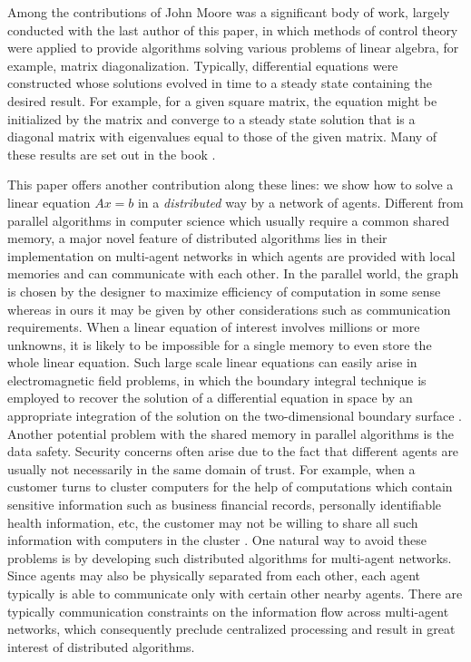 \documentclass{aims}
\begin{document}
Among the contributions of John Moore was a significant body of work,
largely conducted with the last author of this paper, in which methods of control theory
were applied to provide algorithms solving various problems of linear
algebra, for example, matrix diagonalization. Typically, differential
equations were constructed whose solutions evolved in time to a steady
state containing the desired result. For example, for a given square
matrix, the equation might be initialized by the matrix and converge
to a steady state solution that is a diagonal matrix with eigenvalues
equal to those of the given matrix.  Many of these results are set
out in the book \cite{UJ94Book}.

This paper offers another contribution along these lines: we show how
to solve a linear equation $Ax=b$ in a \emph{distributed} way by a network of agents. Different from parallel algorithms in computer science  \cite{O96Cam,RJ05Cam,CAnd97Report} which usually require a common shared memory, a major novel feature of distributed algorithms lies in their implementation on multi-agent networks in which agents are provided with local memories and can communicate with each other. In the parallel world, the graph is chosen by the designer to maximize efficiency of computation in some sense whereas  in ours it may be given by other considerations such as communication requirements. When a linear equation of interest involves millions or more unknowns, it is likely to be impossible for a single memory to even store the whole linear equation. Such large scale linear equations can easily arise in electromagnetic field problems, in which the boundary integral technique is employed to recover the solution of a differential equation in space by an appropriate integration of the solution on the two-dimensional boundary surface \cite{Edelman93}. Another potential problem with the shared memory in parallel algorithms is the data safety. Security concerns often arise due to the fact that different agents are usually not necessarily in the same domain of trust. For example, when a customer turns to cluster computers for the help of computations which contain sensitive information such as business financial records, personally identifiable health information, etc, the customer may not be willing to share all such information with computers in the cluster \cite{CKJQ13TPD}. One natural way to avoid these problems is by developing such distributed algorithms for multi-agent networks. Since agents may also be physically separated from each other, each agent typically is  able to communicate only with certain other nearby agents. There are typically communication constraints on the information flow across multi-agent networks, which consequently preclude centralized processing and result in great interest of distributed algorithms.
\end{document}
